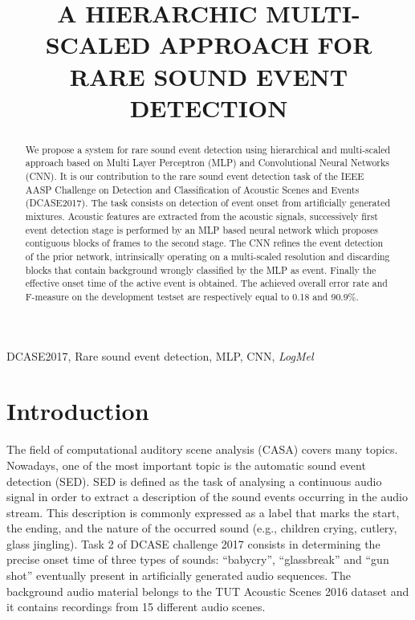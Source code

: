 \documentclass{article}
\title{A HIERARCHIC MULTI-SCALED APPROACH FOR RARE SOUND EVENT DETECTION}
\begin{document}
\ninept
\maketitle

\begin{sloppy}

\begin{abstract}
We propose a system for rare sound event detection using hierarchical and multi-scaled approach based on Multi Layer Perceptron (MLP) and Convolutional Neural Networks (CNN). 
It is our contribution to the rare sound event detection task of the IEEE AASP Challenge on  Detection and Classification of Acoustic Scenes and Events (DCASE2017). The task consists on detection of event onset from artificially generated mixtures. Acoustic features are extracted from the acoustic signals, successively first event detection stage is performed by an MLP based neural network which proposes contiguous blocks of frames to the second stage. The CNN refines the event detection of the prior network, intrinsically operating on a multi-scaled resolution and discarding blocks that contain background wrongly classified by the MLP as event. Finally the effective onset time of the active event is obtained.
The achieved overall error rate and F-measure on the development testset are respectively equal to 0.18 and 90.9\%.
\end{abstract}

\begin{keywords}
DCASE2017, Rare sound event detection, MLP, CNN, \textit{LogMel}
\end{keywords}


\section{Introduction}
\label{sec:intro}


The field of computational auditory scene analysis (CASA) covers many topics. 
Nowadays, one of the most important topic is the automatic sound event detection (SED). 
SED is defined as the task of analysing a continuous audio signal in order to extract a description of the sound events occurring in the audio stream. This description is commonly expressed as a label that marks the start, the ending, and the nature of the occurred sound (e.g., children crying, cutlery, glass jingling).
Task 2 of DCASE challenge 2017 \cite{dcase2017web} consists in determining the precise onset time of three types of sounds: ``babycry'', ``glassbreak'' and ``gun shot'' eventually present in artificially generated audio sequences. The background audio material belongs to the TUT Acoustic Scenes 2016 dataset and it contains recordings from 15 different audio scenes.


\end{sloppy}
\end{document}
